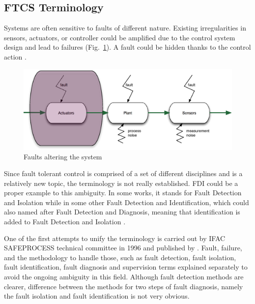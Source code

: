 \subsection{FTCS Terminology}\label{ch2:terminology}

Systems are often sensitive to faults of different nature. 
Existing irregularities in sensors, actuators, or controller could be amplified due to the control system design and lead to failures (Fig.~\ref{fig:faultsInTheSystem}). 
A fault could be hidden thanks to the control action \cite{ducard2009fault}.

\begin{figure}
\begin{center}
\includegraphics[width=15cm]{figures/faultsInTheSystem}    %
\caption{Faults altering the system } 
\label{fig:faultsInTheSystem}
\end{center}
\end{figure}

Since fault tolerant control is comprised of a set of different disciplines and is a relatively new topic, the terminology is not really established. 
FDI could be a proper example to this ambiguity. 
In some works, it stands for Fault Detection and Isolation while in some other Fault Detection and Identification, which could also named after Fault Detection and Diagnosis, 
meaning that identification is added to Fault Detection and Isolation \cite{zhang2008bibliographical}.

One of the first attempts to unify the terminology is carried out by IFAC SAFEPROCESS technical committee in 1996 and published by \cite{isermann1997trends}. 
Fault, failure, and the methodology to handle those, such as fault detection, fault isolation, fault identification, fault diagnosis and supervision terms explained separately to avoid the ongoing ambiguity 
in this field. 
Although fault detection methods are clearer, difference between the methods for two steps of fault diagnosis, namely the fault isolation and fault identification is not very obvious.

